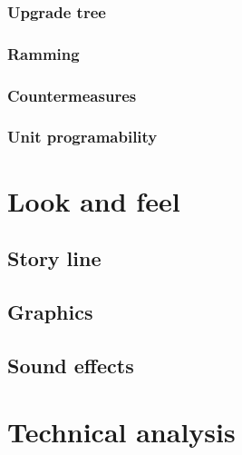 \documentclass{article}[10pt]
\begin{document}
\subsubsection{Upgrade tree}
\paragraph{}

\subsubsection{Ramming}
\paragraph{}

\subsubsection{Countermeasures}
\paragraph{}

\subsubsection{Unit programability}
\paragraph{}

\pagebreak

\section{Look and feel}
\subsection{Story line}
\subsection{Graphics}
\subsection{Sound effects}
\pagebreak

\section{Technical analysis}
\end{document}
